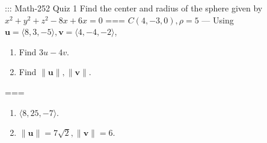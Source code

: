 ::: Math-252 Quiz 1
Find the center and radius of the sphere given by \(x^2+y^2+z^2-8x+6x=0\)
===
\(C(4,-3,0),\rho=5\)
---
Using \(\mathbf u=\langle 8,3,-5\rangle,\mathbf v=\langle 4,-4,-2\rangle\),
\begin{enumerate}[label=\alph*.]
  \item Find \(3u-4v\).
  \item Find \(\|\mathbf u\|,\|\mathbf v\|\).
\end{enumerate}
===
\begin{enumerate}[label=\alph*.]
  \item \(\langle 8,25,-7\rangle\).
  \item \(\|\mathbf u\|=7\sqrt 2,\|\mathbf v\|=6\).
\end{enumerate}
